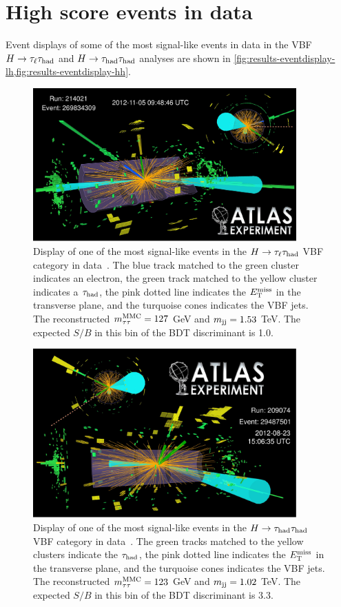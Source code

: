 \section{High score events in data}

Event displays of some of the most signal-like events in data in the VBF $H\rightarrow\tau_\ell\tau_\text{had}$ and $H\rightarrow\tau_\text{had}\tau_\text{had}$ analyses are shown in \cref{fig:results-eventdisplay-lh,fig:results-eventdisplay-hh}.

\begin{figure}[tp]
  \centering
  \includegraphics[width=0.90\textwidth]{figures/HIGG-2013-32/figaux_19}
  \caption{Display of one of the most signal-like events in the $H\rightarrow\tau_\ell\tau_\text{had}$ VBF category in data~\cite{HIGG-2013-32}. The blue track matched to the green cluster indicates an electron, the green track matched to the yellow cluster indicates a $\tau_\text{had}$, the pink dotted line indicates the $E_{\mathrm{T}}^{\mathrm{miss}}$ in the transverse plane, and the turquoise cones indicates the VBF jets. The reconstructed $m_{\tau\tau}^\text{MMC} = 127$ GeV and $m_{\text{jj}} = 1.53$ TeV. The expected $S/B$ in this bin of the BDT discriminant is 1.0.}
  \label{fig:results-eventdisplay-lh}
\end{figure}

\begin{figure}[tp]
  \centering
  \includegraphics[width=0.90\textwidth]{figures/HIGG-2013-32/figaux_20}
  \caption{Display of one of the most signal-like events in the $H\rightarrow\tau_\text{had}\tau_\text{had}$ VBF category in data~\cite{HIGG-2013-32}. The green tracks matched to the yellow clusters indicate the $\tau_\text{had}$, the pink dotted line indicates the $E_{\mathrm{T}}^{\mathrm{miss}}$ in the transverse plane, and the turquoise cones indicates the VBF jets. The reconstructed $m_{\tau\tau}^\text{MMC} = 123$ GeV and $m_{\text{jj}} = 1.02$ TeV. The expected $S/B$ in this bin of the BDT discriminant is 3.3.}
  \label{fig:results-eventdisplay-hh}
\end{figure}

